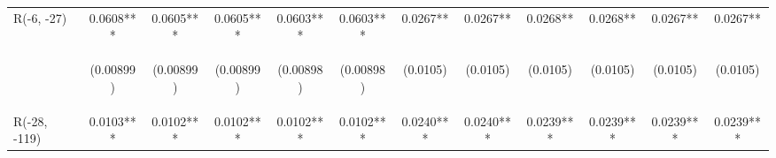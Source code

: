 \documentclass[]{article}
\begin{document}
\begin{center}
\begin{tabular}{lccccccccccc}
R(-6, -27) & 0.0608*** & 0.0605*** & 0.0605*** & 0.0603*** & 0.0603*** & 0.0267** & 0.0267** & 0.0268** & 0.0268** & 0.0267** & 0.0267** \\
\vspace{4pt} & \begin{footnotesize}(0.00899)\end{footnotesize} & \begin{footnotesize}(0.00899)\end{footnotesize} & \begin{footnotesize}(0.00899)\end{footnotesize} & \begin{footnotesize}(0.00898)\end{footnotesize} & \begin{footnotesize}(0.00898)\end{footnotesize} & \begin{footnotesize}(0.0105)\end{footnotesize} & \begin{footnotesize}(0.0105)\end{footnotesize} & \begin{footnotesize}(0.0105)\end{footnotesize} & \begin{footnotesize}(0.0105)\end{footnotesize} & \begin{footnotesize}(0.0105)\end{footnotesize} & \begin{footnotesize}(0.0105)\end{footnotesize} \\
R(-28, -119) & 0.0103*** & 0.0102*** & 0.0102*** & 0.0102*** & 0.0102*** & 0.0240*** & 0.0240*** & 0.0239*** & 0.0239*** & 0.0239*** & 0.0239*** \\

\end{tabular}
\end{center}
\end{document}
